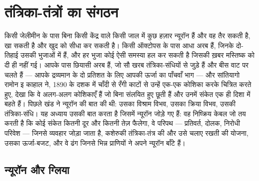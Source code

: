\chapter{तंत्रिका-तंत्रों का संगठन}\label{ch:b3:nervous-systems}

किसी जेलीमीन के पास बिना किसी केंद्र वाले किसी जाल में कुछ हज़ार
न्यूरॉन हैं और वह तैर सकती है, खा सकती है और खुद को सीधा कर सकती है।
किसी ऑक्टोपस के पास आधा अरब हैं, जिनके दो-तिहाई उसकी भुजाओं में हैं,
और हर भुजा कोई ऐसी समस्या हल कर सकती है जिसकी ख़बर मस्तिष्क को दी ही
नहीं गई। आपके पास छियासी अरब हैं, जो सौ खरब तंत्रिका-संधियों से जुड़े
हैं और बीस वाट पर चलते हैं --- आपके द्रव्यमान के दो प्रतिशत के लिए
आपकी ऊर्जा का पाँचवाँ भाग --- और सांतियागो रामोन इ काहाल ने, 1890 के
दशक में चाँदी से रँगी काटों से उन्हें एक-एक कोशिका करके चित्रित करते
हुए, देखा कि वे अलग-अलग कोशिकाएँ हैं जो बिना संलयित हुए छूती हैं और
उनमें संकेत एक ही दिशा में बहते हैं। पिछले खंड ने न्यूरॉन की बात की
थी: उसका विश्राम विभव, उसका क्रिया विभव, उसकी तंत्रिका-संधि। यह अध्याय
उसकी बात करता है जिसमें न्यूरॉन जोड़े गए हैं: वह निष्क्रिय केबल जो तय
करती है कि कोई संकेत कितनी दूर और कितनी तेज़ फैलेगा, वे परिपथ ---
प्रतिवर्त, दोलक, निरोधी परिवेश --- जिनसे व्यवहार जोड़ा जाता है,
कशेरुकी तंत्रिका-तंत्र की और उसे चलाए रखती  की योजना, उसका
ऊर्जा-बजट, और वे ढंग जिनसे भिन्न प्राणियों ने अपने न्यूरॉन बाँटे हैं।

\section{न्यूरॉन और ग्लिया}


